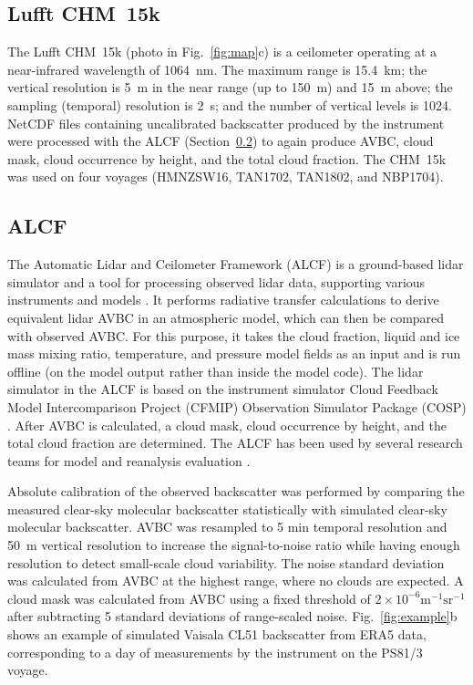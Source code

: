 \documentclass[draft]{agujournal2019}
\begin{document}
\subsection{Lufft CHM~15k}
\label{sec:chm15k}

The Lufft CHM~15k (photo in Fig.~\ref{fig:map}c) is a ceilometer operating at a near-infrared wavelength of 1064~nm. The maximum range is 15.4~km; the vertical resolution is 5~m in the near range (up to 150~m) and 15~m above; the sampling (temporal) resolution is 2~s; and the number of vertical levels is 1024. NetCDF files containing uncalibrated backscatter produced by the instrument were processed with the ALCF (Section~\ref{sec:alcf}) to again produce AVBC, cloud mask, cloud occurrence by height, and the total cloud fraction. The CHM~15k was used on four voyages (HMNZSW16, TAN1702, TAN1802, and NBP1704).

\subsection{ALCF}
\label{sec:alcf}

The Automatic Lidar and Ceilometer Framework (ALCF) is a ground-based lidar simulator and a tool for processing observed lidar data, supporting various instruments and models \cite{kuma2021}. It performs radiative transfer calculations to derive equivalent lidar AVBC in an atmospheric model, which can then be compared with observed AVBC. For this purpose, it takes the cloud fraction, liquid and ice mass mixing ratio, temperature, and pressure model fields as an input and is run offline (on the model output rather than inside the model code). The lidar simulator in the ALCF is based on the instrument simulator Cloud Feedback Model Intercomparison Project (CFMIP) Observation Simulator Package (COSP) \cite{bodas-salcedo2011}. After AVBC is calculated, a cloud mask, cloud occurrence by height, and the total cloud fraction are determined. The ALCF has been used by several research teams for model and reanalysis evaluation \cite{kuma2020,kremser2021,guyot2022,pei2023,whitehead2023,mcdonald2024a}.

Absolute calibration of the observed backscatter was performed by comparing the measured clear-sky molecular backscatter statistically with simulated clear-sky molecular backscatter. AVBC was resampled to 5 min temporal resolution and 50~m vertical resolution to increase the signal-to-noise ratio while having enough resolution to detect small-scale cloud variability. The noise standard deviation was calculated from AVBC at the highest range, where no clouds are expected. A cloud mask was calculated from AVBC using a fixed threshold of $\mathrm{2\times 10^{-6} m^{-1}sr^{-1}}$ after subtracting 5 standard deviations of range-scaled noise. Fig.~\ref{fig:example}b shows an example of simulated Vaisala CL51 backscatter from ERA5 data, corresponding to a day of measurements by the instrument on the PS81/3 voyage.
\end{document}
